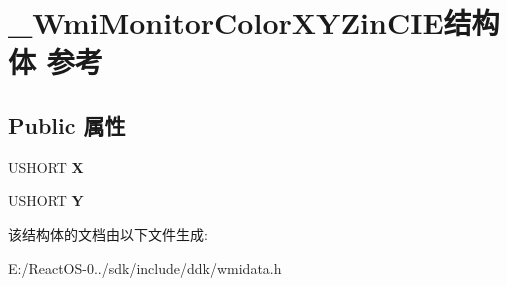 \hypertarget{struct___wmi_monitor_color_x_y_zin_c_i_e}{}\section{\+\_\+\+Wmi\+Monitor\+Color\+X\+Y\+Zin\+C\+I\+E结构体 参考}
\label{struct___wmi_monitor_color_x_y_zin_c_i_e}
\subsection*{Public 属性}
\begin{DoxyCompactItemize}
\item 
\mbox{\label{struct___wmi_monitor_color_x_y_zin_c_i_e_a8c7ac8dbdee143b5147b2caf04a5f725}} 
U\+S\+H\+O\+RT {\bfseries X}
\item 
\mbox{\label{struct___wmi_monitor_color_x_y_zin_c_i_e_a90e571c508ea95bea0f9bf8d8278bec8}} 
U\+S\+H\+O\+RT {\bfseries Y}
\end{DoxyCompactItemize}


该结构体的文档由以下文件生成\+:\begin{DoxyCompactItemize}
\item 
E\+:/\+React\+O\+S-\/0../sdk/include/ddk/wmidata.\+h\end{DoxyCompactItemize}
